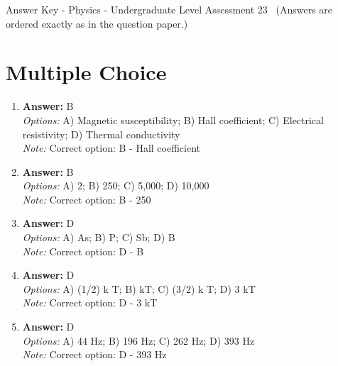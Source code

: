 \documentclass[12pt]{article}
\begin{document}
\begin{center}
Answer Key - Physics - Undergraduate Level Assessment 23 \
\small (Answers are ordered exactly as in the question paper.)
\end{center}

\section*{Multiple Choice}
\begin{enumerate}[label=\arabic*.]
\item \textbf{Answer:} B
\\ \textit{Options:} A) Magnetic susceptibility; B) Hall coefficient; C) Electrical resistivity; D) Thermal conductivity
\\ \textit{Note:} Correct option: B - Hall coefficient
\item \textbf{Answer:} B
\\ \textit{Options:} A) 2; B) 250; C) 5,000; D) 10,000
\\ \textit{Note:} Correct option: B - 250
\item \textbf{Answer:} D
\\ \textit{Options:} A) As; B) P; C) Sb; D) B
\\ \textit{Note:} Correct option: D - B
\item \textbf{Answer:} D
\\ \textit{Options:} A) (1/2) k T; B) kT; C) (3/2) k T; D) 3 kT
\\ \textit{Note:} Correct option: D - 3 kT
\item \textbf{Answer:} D
\\ \textit{Options:} A) 44 Hz; B) 196 Hz; C) 262 Hz; D) 393 Hz
\\ \textit{Note:} Correct option: D - 393 Hz
\end{enumerate}
\end{document}
